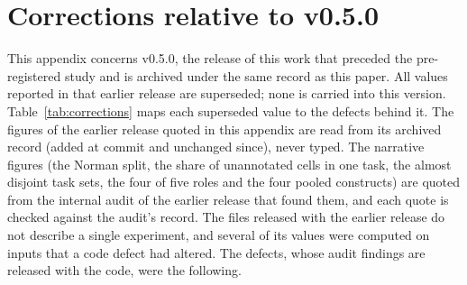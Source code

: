 
\section{Corrections relative to v0.5.0}\label{app:corrections}

This appendix concerns v0.5.0, the release of this work that preceded the pre-registered
study and is archived under the same record as this paper. All values reported in that earlier
release are superseded; none is carried into this version. Table~\ref{tab:corrections} maps
each superseded value to the defects behind it. The figures of the earlier release quoted in this appendix are read from its archived
record (added at commit \texttt{\resVFiveRecordCommit} and unchanged since), never typed. The
narrative figures (the Norman split, the share of unannotated cells in one task, the almost
disjoint task sets, the four of five roles and the four pooled constructs) are quoted from the
internal audit of the earlier release that found them, and each quote is checked against the
audit's record. The
files released with the earlier release do not describe a single experiment, and several of its
values were computed on inputs that a code defect had altered. The defects, whose
audit findings are released with the code, were the following.

